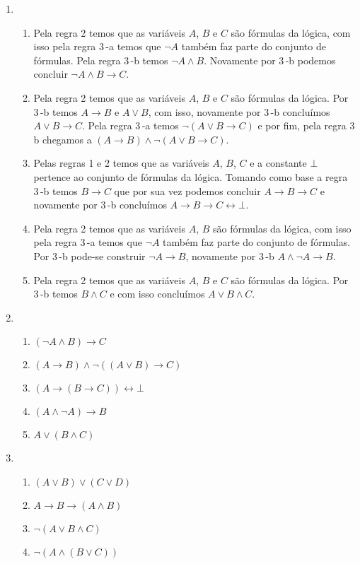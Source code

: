 	\begin{enumerate}
	
			\item 
			\begin{enumerate}		
					\item 
					Pela regra 2 temos que as vari\'aveis $A$, $B$ e $C$ s\~ao f\'ormulas da l\'ogica, com isso pela regra 3\,-a temos que $\neg A$ tamb\'em faz parte do conjunto de f\'ormulas. Pela regra 3\,-b temos $\neg A \land B$. Novamente por 3\,-b podemos concluir $\neg A \land B \to C $. 
					
					\item
					Pela regra 2 temos que as vari\'aveis $A$, $B$ e $C$ s\~ao f\'ormulas da l\'ogica. Por 3\,-b temos $A \to B$ e $A \lor B$, com isso, novamente por 3\,-b conclu\'imos $A \lor B \to C$. Pela regra 3\,-a temos $\neg(A \lor B \to C)$ e por fim, pela regra 3\,b chegamos a $(A \to B) \land \neg(A \lor B \to C)$.
					
					\item
					Pelas regras 1 e 2 temos que as vari\'aveis $A$, $B$, $C$ e a constante $ \bot $ pertence ao conjunto de f\'ormulas da l\'ogica. Tomando como base a regra 3\,-b temos $B \to C$ que por sua vez podemos concluir $A \to B \to C $ e novamente por 3\,-b conclu\'imos  $A \to B \to C \leftrightarrow \bot $.
					
					\item
					Pela regra 2 temos que as vari\'aveis $A$, $B$ s\~ao f\'ormulas da l\'ogica, com isso pela regra 3\,-a temos que $\neg A$ tamb\'em faz parte do conjunto de f\'ormulas. Por 3\,-b pode-se construir $\neg A \to B $, novamente por 3\,-b $ A \land \neg A \to B $.
					
					\item
					Pela regra 2 temos que as vari\'aveis $A$, $B$ e $C$ s\~ao f\'ormulas da l\'ogica. Por 3\,-b temos $B \land C$ e com isso conclu\'imos $A \lor B \land C$.			
			\end{enumerate}
			
			\item
			\begin{enumerate}
				\item $(\neg A \land B) \to C$
				\item $(A \to B) \land \neg((A \lor B) \to C)$
				\item $(A \to (B \to C)) \leftrightarrow \bot$
				\item $(A \land \neg A) \to B$
				\item $A \lor (B \land C)$
			\end{enumerate}
			
			
			\item
				\begin{enumerate}
					\item $(A \lor B) \lor (C \lor D)$
					\item $A \to B \to (A \land B)$
					\item $\neg (A \lor B \land C)$
					\item $\neg (A \land (B \lor C))$
				\end{enumerate}
	
	\end{enumerate}

